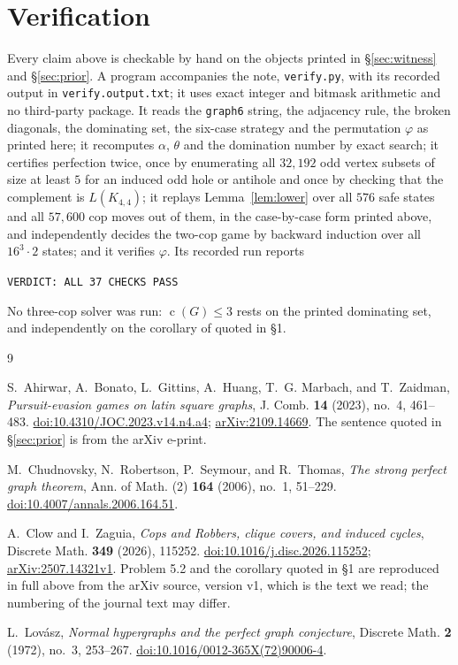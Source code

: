 \documentclass[11pt]{amsart}
\theoremstyle{definition}
\DeclareMathOperator{\cop}{c}
\newcommand{\al}{\alpha}
\newcommand{\theonum}{\theta}
\newcommand{\Gwit}{G}
\begin{document}
\section{Verification}

Every claim above is checkable by hand on the objects printed in
\S\ref{sec:witness} and \S\ref{sec:prior}. A program accompanies the note,
\texttt{verify.py}, with its recorded output in \texttt{verify.output.txt}; it
uses exact integer and bitmask arithmetic and no third-party package. It reads
the \texttt{graph6} string, the adjacency rule, the broken diagonals, the
dominating set, the six-case strategy and the permutation $\varphi$ as printed
here; it recomputes $\al$, $\theonum$ and the domination number by exact
search; it certifies perfection twice, once by enumerating all $32{,}192$ odd
vertex subsets of size at least $5$ for an induced odd hole or antihole and
once by checking that the complement is $L(K_{4,4})$; it replays
Lemma~\ref{lem:lower} over all $576$ safe states and all $57{,}600$ cop moves
out of them, in the case-by-case form printed above, and independently decides
the two-cop game by backward induction over all $16^3\cdot2$ states; and it
verifies $\varphi$. Its recorded run reports
\begin{center}
\texttt{VERDICT: ALL 37 CHECKS PASS}
\end{center}
No three-cop solver was run: $\cop(\Gwit)\le3$ rests on the printed dominating
set, and independently on the corollary of \cite{CZ} quoted in \S1.

\begin{thebibliography}{9}

S.~Ahirwar, A.~Bonato, L.~Gittins, A.~Huang, T.~G. Marbach, and T.~Zaidman,
\emph{Pursuit-evasion games on latin square graphs},
J. Comb. \textbf{14} (2023), no.~4, 461--483.
\href{https://doi.org/10.4310/JOC.2023.v14.n4.a4}{doi:10.4310/JOC.2023.v14.n4.a4};
\href{https://arxiv.org/abs/2109.14669}{arXiv:2109.14669}.
The sentence quoted in \S\ref{sec:prior} is from the arXiv e-print.

M.~Chudnovsky, N.~Robertson, P.~Seymour, and R.~Thomas,
\emph{The strong perfect graph theorem},
Ann. of Math. (2) \textbf{164} (2006), no.~1, 51--229.
\href{https://doi.org/10.4007/annals.2006.164.51}{doi:10.4007/annals.2006.164.51}.

A.~Clow and I.~Zaguia,
\emph{Cops and Robbers, clique covers, and induced cycles},
Discrete Math. \textbf{349} (2026), 115252.
\href{https://doi.org/10.1016/j.disc.2026.115252}{doi:10.1016/j.disc.2026.115252};
\href{https://arxiv.org/abs/2507.14321}{arXiv:2507.14321v1}.
Problem 5.2 and the corollary quoted in \S1 are reproduced in full above from
the arXiv source, version v1, which is the text we read; the numbering of the
journal text may differ.

L.~Lov\'asz,
\emph{Normal hypergraphs and the perfect graph conjecture},
Discrete Math. \textbf{2} (1972), no.~3, 253--267.
\href{https://doi.org/10.1016/0012-365X(72)90006-4}{doi:10.1016/0012-365X(72)90006-4}.

\end{thebibliography}
\end{document}
